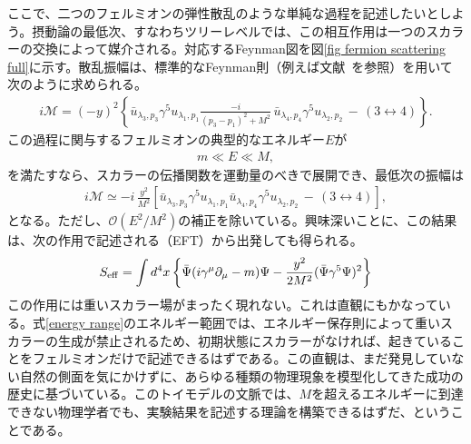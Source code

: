 ここで、二つのフェルミオンの弾性散乱のような単純な過程を記述したいとしよう。摂動論の最低次、すなわちツリーレベルでは、この相互作用は一つのスカラーの交換によって媒介される。対応するFeynman図を図\ref{fig fermion scattering full}に示す。散乱振幅は、標準的なFeynman則（例えば文献~\cite{Srednicki:2007ab}を参照）を用いて次のように求められる。
%
\begin{align}
	i \mathcal{M} = (- y)^2 \left\{ \bar u_{\lambda_3, p_3} \gamma^5 u_{\lambda_1, p_1} \frac{-i}{(p_3-p_1)^2 +M^2} \,  \bar u_{\lambda_4, p_4} \gamma^5 u_{\lambda_2, p_2} \, - \, (3 \leftrightarrow 4) \right\} . 
\end{align}
%
この過程に関与するフェルミオンの典型的なエネルギー$E$が
%
\begin{align} \label{energy range}
	m \ll E \ll M , 
\end{align}
%
を満たすなら、スカラーの伝播関数を運動量のべきで展開でき、最低次の振幅は
%
\begin{align} \label{4pt amplitude EFT}
	i \mathcal{M} \simeq - i \, \frac{y^2}{M^2} \left[ \bar u_{\lambda_3, p_3} \gamma^5 u_{\lambda_1, p_1}  \bar u_{\lambda_4, p_4} \gamma^5 u_{\lambda_2, p_2} \, - \, (3 \leftrightarrow 4) \right] ,
\end{align}
%
となる。ただし、$\mathcal{O}(E^2 /M^2)$の補正を除いている。興味深いことに、この結果は、次の作用で記述される（EFT）から出発しても得られる。
%
\begin{align} \label{4pt tree effective theory}
	S_{\rm eff} = \int d^4 x \left\{ \bar \Psi (i \gamma^\mu \partial_\mu - m ) \Psi - \frac{y^2}{2 M^2} (\bar  \Psi \gamma^5 \Psi)^2 \right\} 
\end{align}
%
この作用には重いスカラー場がまったく現れない。これは直観にもかなっている。式\eqref{energy range}のエネルギー範囲では、エネルギー保存則によって重いスカラーの生成が禁止されるため、初期状態にスカラーがなければ、起きていることをフェルミオンだけで記述できるはずである。この直観は、まだ発見していない自然の側面を気にかけずに、あらゆる種類の物理現象を模型化してきた成功の歴史に基づいている。このトイモデルの文脈では、$M$を超えるエネルギーに到達できない物理学者でも、実験結果を記述する理論を構築できるはずだ、ということである。

